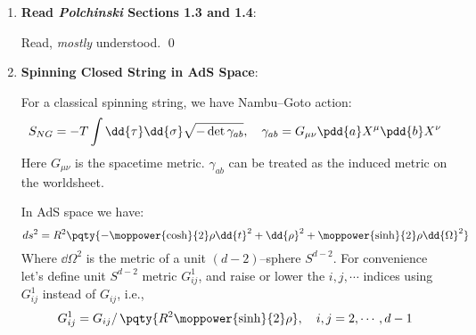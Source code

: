 \documentclass[a4paper,10pt]{article}
\newcommand{\sqsinh}{\moppower{\sinh}{2}}
\newcommand{\sqcosh}{\moppower{\cosh}{2}}
\begin{document}
\maketitle
\pagestyle{headings}
\thispagestyle{empty}

	\begin{enumerate}
	\item \textbf{Read \textit{Polchinski} Sections 1.3 and 1.4}: 
	
	Read, \textit{mostly} understood. \qed
	
	\item \textbf{Spinning Closed String in AdS Space}:
	
	For a classical spinning string, we have Nambu--Goto action:
	\begin{equation}
		S_{NG}
		= -T \int \dd{\tau} \dd{\sigma}
			\sqrt{-\det \gamma_{ab}},\quad
		\gamma_{ab} = G_{\mu\nu}
			\pdd{a}X^\mu \pdd{b}X^\nu
	\end{equation}
	Here $G_{\mu\nu}$ is the spacetime metric. $\gamma_{ab}$ can be treated as the induced metric on the worldsheet. 
	
	In AdS space we have:
	\begin{equation}
		ds^2
		= R^2\pqty{
			- \sqcosh\rho \dd{t}^2
			+ \dd{\rho}^2
			+ \sqsinh\rho \dd{\Omega}^2
		}
	\end{equation}
	Where $\dd{\Omega}^2$ is the metric of a unit $(d-2)$--sphere $S^{d-2}$. For convenience let's define unit $S^{d-2}$ metric $G^1_{ij}$, and raise or lower the $i,j,\cdots$ indices using $G^1_{ij}$ instead of $G_{ij}$, i.e.,
	\begin{equation}
		G^1_{ij} = G_{ij} /\,\pqty{
			R^2 \sqsinh\rho
		},\quad
		i,j = 2,\cdots,d-1
	\end{equation}
	

\end{enumerate}
\end{document}
